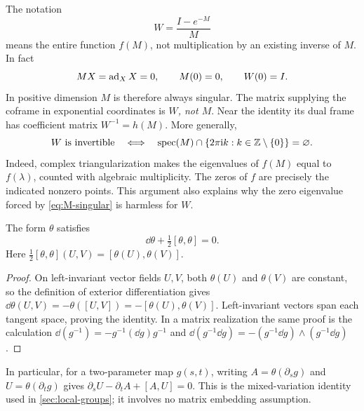 The notation
\begin{equation}\label{eq:W-quotient}
 W=\frac{I-e^{-M}}{M}
\end{equation}
means the entire function $f(M)$, not multiplication by an existing inverse of $M$. In fact
\begin{equation}\label{eq:M-singular}
 M X=\operatorname{ad}_X X=0,\qquad M(0)=0,\qquad W(0)=I.
\end{equation}
In positive dimension $M$ is therefore always singular. The matrix supplying the coframe in exponential coordinates is \emph{$W$, not $M$}. Near the identity its dual frame has coefficient matrix $W^{-1}=h(M)$. More generally,
\begin{equation}\label{eq:W-invertibility}
 W\text{ is invertible}\quad\Longleftrightarrow\quad
 \operatorname{spec}(M)\cap\{2\pi\mathrm i k:k\in\mathbb Z\setminus\{0\}\}=\varnothing.
\end{equation}
Indeed, complex triangularization makes the eigenvalues of $f(M)$ equal to $f(\lambda)$, counted with algebraic multiplicity. The zeros of $f$ are precisely the indicated nonzero points. This argument also explains why the zero eigenvalue forced by \cref{eq:M-singular} is harmless for $W$.

\begin{proposition}\label{prop:maurer-cartan}
The form $\theta$ satisfies
\begin{equation}\label{eq:maurer-cartan}
 \dd\theta+\tfrac12[\theta,\theta]=0.
\end{equation}
Here $\tfrac12[\theta,\theta](U,V)=[\theta(U),\theta(V)]$.
\end{proposition}
\begin{proof}
On left-invariant vector fields $U,V$, both $\theta(U)$ and $\theta(V)$ are constant, so the definition of exterior differentiation gives
$\dd\theta(U,V)=-\theta([U,V])=-[\theta(U),\theta(V)]$.
Left-invariant vectors span each tangent space, proving the identity. In a matrix realization the same proof is the calculation
$\dd(g^{-1})=-g^{-1}(\dd g)g^{-1}$ and
$\dd(g^{-1}\dd g)=-(g^{-1}\dd g)\wedge(g^{-1}\dd g)$.
\end{proof}
In particular, for a two-parameter map $g(s,t)$, writing
$A=\theta(\partial_sg)$ and $U=\theta(\partial_tg)$ gives
$\partial_sU-\partial_tA+[A,U]=0$. This is the mixed-variation identity used in \cref{sec:local-groups}; it involves no matrix embedding assumption.

